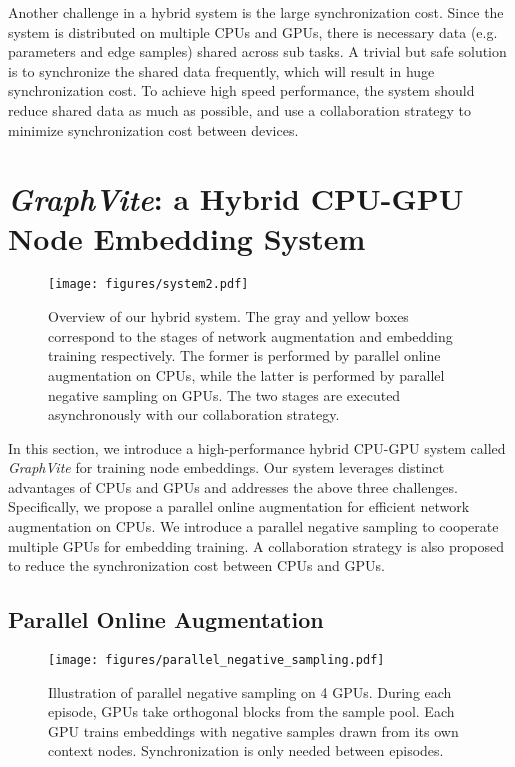 \documentclass[sigconf]{acmart}
\newcommand{\Graphy}{\textit{GraphVite}\xspace}
\begin{document}
Another challenge in a hybrid system is the large synchronization cost. Since the system is distributed on multiple CPUs and GPUs, there is necessary data (e.g. parameters and edge samples) shared across sub tasks. A trivial but safe solution is to synchronize the shared data frequently, which will result in huge synchronization cost. To achieve high speed performance, the system should reduce shared data as much as possible, and use a collaboration strategy to minimize synchronization cost between devices. \section{\Graphy: a Hybrid CPU-GPU Node Embedding System}
\label{sec:method}

\begin{figure}[!h]
    \centering
    \texttt{[image: figures/system2.pdf]}
    \caption{Overview of our hybrid system. The gray and yellow boxes correspond to the stages of network augmentation and embedding training respectively. The former is performed by parallel online augmentation on CPUs, while the latter is performed by parallel negative sampling on GPUs. The two stages are executed asynchronously with our collaboration strategy.}
    \label{fig:system}
\end{figure}

In this section, we introduce a high-performance hybrid CPU-GPU system called \Graphy for training node embeddings. Our system leverages distinct advantages of CPUs and GPUs and addresses the above three challenges. Specifically, we propose a parallel online augmentation for efficient network augmentation on CPUs. We introduce a parallel negative sampling to cooperate multiple GPUs for embedding training. A collaboration strategy is also proposed to reduce the synchronization cost between CPUs and GPUs.

\subsection{Parallel Online Augmentation}
\label{sec:parallel_augmentation}

\begin{figure*}
    \texttt{[image: figures/parallel\_negative\_sampling.pdf]}
    \caption{Illustration of parallel negative sampling on 4 GPUs. During each episode, GPUs take orthogonal blocks from the sample pool. Each GPU trains embeddings with negative samples drawn from its own context nodes. Synchronization is only needed between episodes.}
    \label{fig:parallel_negative_sampling}
\end{figure*}
\end{document}
